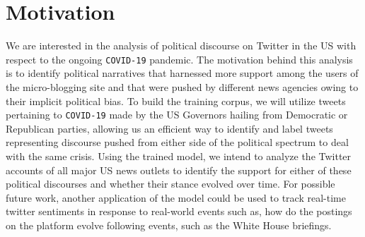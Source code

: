 \section*{Motivation}


We are interested in the analysis of political discourse on Twitter in the US with respect to the ongoing \texttt{COVID-19} pandemic. The motivation behind this analysis is to identify political narratives that harnessed more support among the users of the micro-blogging site and that were pushed by different news agencies owing to their implicit political bias. To build the training corpus, we will utilize tweets pertaining to \texttt{COVID-19} made by the US Governors hailing from Democratic or Republican parties, allowing us an efficient way to identify and label tweets representing discourse pushed from either side of the political spectrum to deal with the same crisis. Using the trained model, we intend to analyze the Twitter accounts of all major US news outlets to identify the support for either of these political discourses and whether their stance evolved over time. For possible future work, another application of the model could be used to track real-time twitter sentiments in response to real-world events such as, how do the postings on the platform evolve following events, such as the White House briefings.


 

